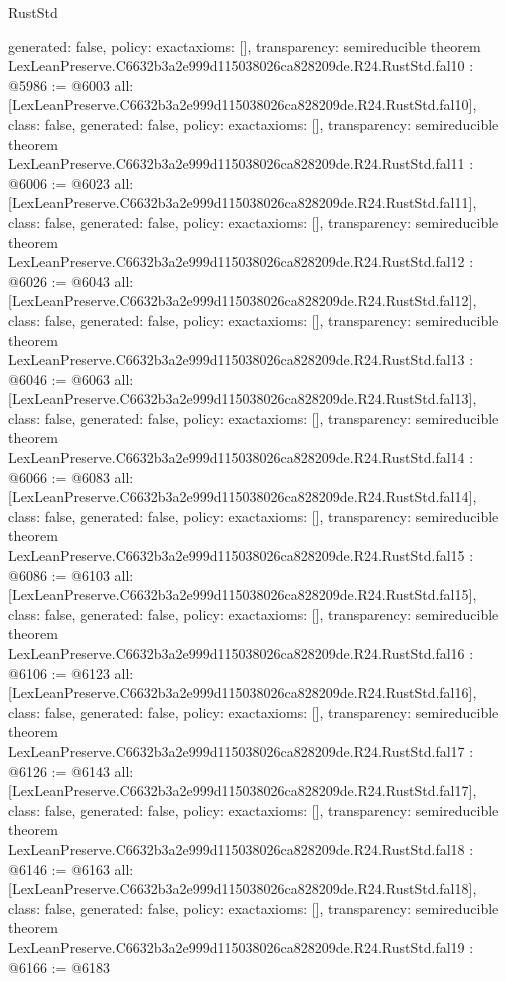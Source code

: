 \begin{lexlean}{RustStd}
\begin{coremodule}
{  generated: false,
  policy: exact{axioms: []},
  transparency: semireducible
}
theorem LexLeanPreserve.C6632b3a2e999d115038026ca828209de.R24.RustStd.fal10 : @5986 := @6003 {
  all: [LexLeanPreserve.C6632b3a2e999d115038026ca828209de.R24.RustStd.fal10],
  class: false,
  generated: false,
  policy: exact{axioms: []},
  transparency: semireducible
}
theorem LexLeanPreserve.C6632b3a2e999d115038026ca828209de.R24.RustStd.fal11 : @6006 := @6023 {
  all: [LexLeanPreserve.C6632b3a2e999d115038026ca828209de.R24.RustStd.fal11],
  class: false,
  generated: false,
  policy: exact{axioms: []},
  transparency: semireducible
}
theorem LexLeanPreserve.C6632b3a2e999d115038026ca828209de.R24.RustStd.fal12 : @6026 := @6043 {
  all: [LexLeanPreserve.C6632b3a2e999d115038026ca828209de.R24.RustStd.fal12],
  class: false,
  generated: false,
  policy: exact{axioms: []},
  transparency: semireducible
}
theorem LexLeanPreserve.C6632b3a2e999d115038026ca828209de.R24.RustStd.fal13 : @6046 := @6063 {
  all: [LexLeanPreserve.C6632b3a2e999d115038026ca828209de.R24.RustStd.fal13],
  class: false,
  generated: false,
  policy: exact{axioms: []},
  transparency: semireducible
}
theorem LexLeanPreserve.C6632b3a2e999d115038026ca828209de.R24.RustStd.fal14 : @6066 := @6083 {
  all: [LexLeanPreserve.C6632b3a2e999d115038026ca828209de.R24.RustStd.fal14],
  class: false,
  generated: false,
  policy: exact{axioms: []},
  transparency: semireducible
}
theorem LexLeanPreserve.C6632b3a2e999d115038026ca828209de.R24.RustStd.fal15 : @6086 := @6103 {
  all: [LexLeanPreserve.C6632b3a2e999d115038026ca828209de.R24.RustStd.fal15],
  class: false,
  generated: false,
  policy: exact{axioms: []},
  transparency: semireducible
}
theorem LexLeanPreserve.C6632b3a2e999d115038026ca828209de.R24.RustStd.fal16 : @6106 := @6123 {
  all: [LexLeanPreserve.C6632b3a2e999d115038026ca828209de.R24.RustStd.fal16],
  class: false,
  generated: false,
  policy: exact{axioms: []},
  transparency: semireducible
}
theorem LexLeanPreserve.C6632b3a2e999d115038026ca828209de.R24.RustStd.fal17 : @6126 := @6143 {
  all: [LexLeanPreserve.C6632b3a2e999d115038026ca828209de.R24.RustStd.fal17],
  class: false,
  generated: false,
  policy: exact{axioms: []},
  transparency: semireducible
}
theorem LexLeanPreserve.C6632b3a2e999d115038026ca828209de.R24.RustStd.fal18 : @6146 := @6163 {
  all: [LexLeanPreserve.C6632b3a2e999d115038026ca828209de.R24.RustStd.fal18],
  class: false,
  generated: false,
  policy: exact{axioms: []},
  transparency: semireducible
}
theorem LexLeanPreserve.C6632b3a2e999d115038026ca828209de.R24.RustStd.fal19 : @6166 := @6183 {
}
\end{coremodule}
\end{lexlean}

